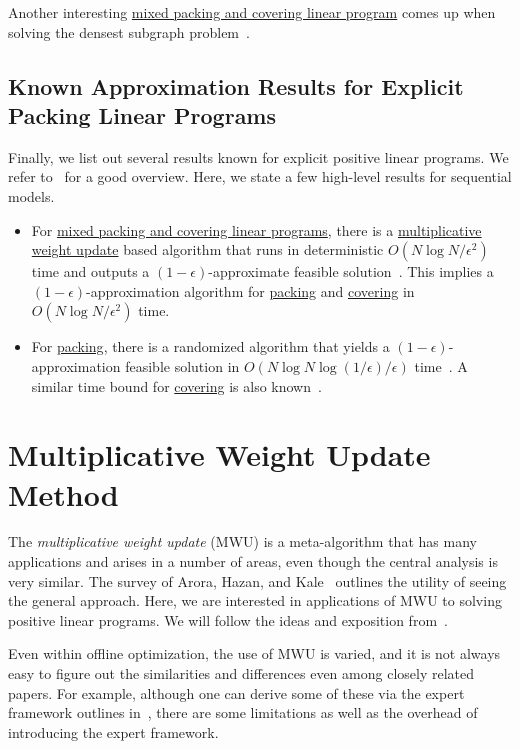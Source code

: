 \begin{eg}
	Another interesting \hyperref[def:mixed-packing-covering-LP]{mixed packing and covering linear program} comes up when solving the densest subgraph problem~\cite{bahmani2014efficient}.
\end{eg}

\subsection{Known Approximation Results for Explicit Packing Linear Programs}
Finally, we list out several results known for explicit positive linear programs. We refer to~\cite{quanrud2019fast,wang2017fast} for a good overview. Here, we state a few high-level results for sequential models.
\begin{itemize}
	\item For \hyperref[def:mixed-packing-covering-LP]{mixed packing and covering linear programs}, there is a \hyperref[algo:MWU-discrete-non-uniform]{multiplicative weight update} based algorithm that runs in deterministic \(O(N \log N / \epsilon ^2)\) time and outputs a \((1 - \epsilon )\)-approximate feasible solution~\cite{young2014nearly}. This implies a \((1 - \epsilon )\)-approximation algorithm for \hyperref[def:packing-LP]{packing} and \hyperref[def:covering-LP]{covering} in \(O(N \log N / \epsilon ^2)\) time.
	\item For \hyperref[def:packing-LP]{packing}, there is a randomized algorithm that yields a \((1 - \epsilon )\)-approximation feasible solution in \(O(N \log N \log (1 / \epsilon ) / \epsilon )\) time~\cite{allen2015nearly}. A similar time bound for \hyperref[def:covering-LP]{covering} is also known~\cite{wang2015unified}.
\end{itemize}

\section{Multiplicative Weight Update Method}
The \emph{multiplicative weight update} (MWU) is a meta-algorithm that has many applications and arises in a number of areas, even though the central analysis is very similar. The survey of Arora, Hazan, and Kale~\cite{arora2012multiplicative} outlines the utility of seeing the general approach. Here, we are interested in applications of MWU to solving positive linear programs. We will follow the ideas and exposition from~\cite{chekuri2015multiplicative}.

\begin{note}
	Even within offline optimization, the use of MWU is varied, and it is not always easy to figure out the similarities and differences even among closely related papers. For example, although one can derive some of these via the expert framework outlines in~\cite{arora2012multiplicative}, there are some limitations as well as the overhead of introducing the expert framework.
\end{note}

